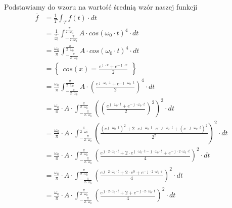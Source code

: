 Podstawiamy do wzoru na wartość średnią wzór naszej funkcji
\begin{align*}
\bar{f} &=\frac{1}{T}\int_{T}^{} f(t) \cdot dt\\
&=\frac{1}{\frac{\pi}{\omega_0}}\int_{-\frac{\pi}{2\cdot\omega_0}}^{\frac{\pi}{2\cdot\omega_0}} A \cdot cos\left(\omega_0 \cdot t\right)^4 \cdot dt\\
&=\frac{\omega_0}{\pi}\int_{-\frac{\pi}{2\cdot\omega_0}}^{\frac{\pi}{2\cdot\omega_0}} A \cdot cos\left(\omega_0 \cdot t\right)^4 \cdot dt\\
&=\begin{Bmatrix}cos(x)=\frac{e^{\jmath \cdot x}+e^{-\jmath \cdot x}}{2}\end{Bmatrix}\\
&=\frac{\omega_0}{\pi}\int_{-\frac{\pi}{2\cdot\omega_0}}^{\frac{\pi}{2\cdot\omega_0}} A \cdot \left( \frac{e^{\jmath \cdot \omega_0 \cdot t}+e^{-\jmath \cdot \omega_0 \cdot t}}{2} \right)^4 \cdot dt\\
&=\frac{\omega_0}{\pi} \cdot A \cdot \int_{-\frac{\pi}{2\cdot\omega_0}}^{\frac{\pi}{2\cdot\omega_0}} \left( \left( \frac{e^{\jmath \cdot \omega_0 \cdot t}+e^{-\jmath \cdot \omega_0 \cdot t}}{2} \right)^2\right)^2 \cdot dt\\
&=\frac{\omega_0}{\pi} \cdot A \cdot \int_{-\frac{\pi}{2\cdot\omega_0}}^{\frac{\pi}{2\cdot\omega_0}} \left(  \frac{\left(e^{\jmath \cdot \omega_0 \cdot t}\right)^2+2\cdot e^{\jmath \cdot \omega_0 \cdot t} \cdot e^{-\jmath \cdot \omega_0 \cdot t} + \left(e^{-\jmath \cdot \omega_0 \cdot t}\right)^2}{2^2} \right)^2 \cdot dt\\
&=\frac{\omega_0}{\pi} \cdot A \cdot \int_{-\frac{\pi}{2\cdot\omega_0}}^{\frac{\pi}{2\cdot\omega_0}} \left(  \frac{e^{\jmath \cdot 2 \cdot \omega_0 \cdot t}+2\cdot e^{\jmath \cdot \omega_0 \cdot t -\jmath \cdot \omega_0 \cdot t} + e^{-\jmath \cdot 2 \cdot \omega_0 \cdot t}}{4} \right)^2 \cdot dt\\
&=\frac{\omega_0}{\pi} \cdot A \cdot \int_{-\frac{\pi}{2\cdot\omega_0}}^{\frac{\pi}{2\cdot\omega_0}} \left(  \frac{e^{\jmath \cdot 2 \cdot \omega_0 \cdot t}+2\cdot e^{0} + e^{-\jmath \cdot 2 \cdot \omega_0 \cdot t}}{4} \right)^2 \cdot dt\\
&=\frac{\omega_0}{\pi} \cdot A \cdot \int_{-\frac{\pi}{2\cdot\omega_0}}^{\frac{\pi}{2\cdot\omega_0}} \left(  \frac{e^{\jmath \cdot 2 \cdot \omega_0 \cdot t}+2 + e^{-\jmath \cdot 2 \cdot \omega_0 \cdot t}}{4} \right)^2 \cdot dt\\

\end{align*}

